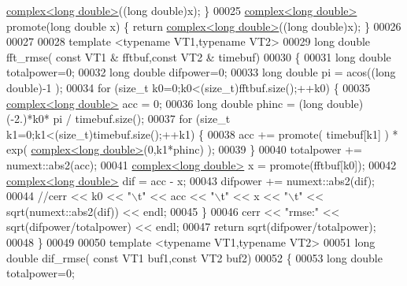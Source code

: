 \begin{DoxyCode}
      \hyperlink{structcomplex}{complex<long double>}((\textcolor{keywordtype}{long} double)x); \}
00025 \hyperlink{structcomplex}{complex<long double>}  promote(\textcolor{keywordtype}{long} \textcolor{keywordtype}{double} x) \{ \textcolor{keywordflow}{return} 
      \hyperlink{structcomplex}{complex<long double>}((\textcolor{keywordtype}{long} double)x); \}
00026     
00027 
00028     \textcolor{keyword}{template} <\textcolor{keyword}{typename} VT1,\textcolor{keyword}{typename} VT2>
00029     \textcolor{keywordtype}{long} \textcolor{keywordtype}{double} fft\_rmse( \textcolor{keyword}{const} VT1 & fftbuf,\textcolor{keyword}{const} VT2 & timebuf)
00030     \{
00031         \textcolor{keywordtype}{long} \textcolor{keywordtype}{double} totalpower=0;
00032         \textcolor{keywordtype}{long} \textcolor{keywordtype}{double} difpower=0;
00033         \textcolor{keywordtype}{long} \textcolor{keywordtype}{double} pi = acos((\textcolor{keywordtype}{long} \textcolor{keywordtype}{double})-1 );
00034         \textcolor{keywordflow}{for} (\textcolor{keywordtype}{size\_t} k0=0;k0<(size\_t)fftbuf.size();++k0) \{
00035             \hyperlink{structcomplex}{complex<long double>} acc = 0;
00036             \textcolor{keywordtype}{long} \textcolor{keywordtype}{double} phinc = (\textcolor{keywordtype}{long} double)(-2.)*k0* pi / timebuf.size();
00037             \textcolor{keywordflow}{for} (\textcolor{keywordtype}{size\_t} k1=0;k1<(size\_t)timebuf.size();++k1) \{
00038                 acc +=  promote( timebuf[k1] ) * exp( \hyperlink{structcomplex}{complex<long double>}(0,k1*phinc) 
      );
00039             \}
00040             totalpower += numext::abs2(acc);
00041             \hyperlink{structcomplex}{complex<long double>} x = promote(fftbuf[k0]); 
00042             \hyperlink{structcomplex}{complex<long double>} dif = acc - x;
00043             difpower += numext::abs2(dif);
00044             \textcolor{comment}{//cerr << k0 << "\(\backslash\)t" << acc << "\(\backslash\)t" <<  x << "\(\backslash\)t" << sqrt(numext::abs2(dif)) << endl;}
00045         \}
00046         cerr << \textcolor{stringliteral}{"rmse:"} << sqrt(difpower/totalpower) << endl;
00047         \textcolor{keywordflow}{return} sqrt(difpower/totalpower);
00048     \}
00049 
00050     \textcolor{keyword}{template} <\textcolor{keyword}{typename} VT1,\textcolor{keyword}{typename} VT2>
00051     \textcolor{keywordtype}{long} \textcolor{keywordtype}{double} dif\_rmse( \textcolor{keyword}{const} VT1 buf1,\textcolor{keyword}{const} VT2 buf2)
00052     \{
00053         \textcolor{keywordtype}{long} \textcolor{keywordtype}{double} totalpower=0;

\end{DoxyCode}
